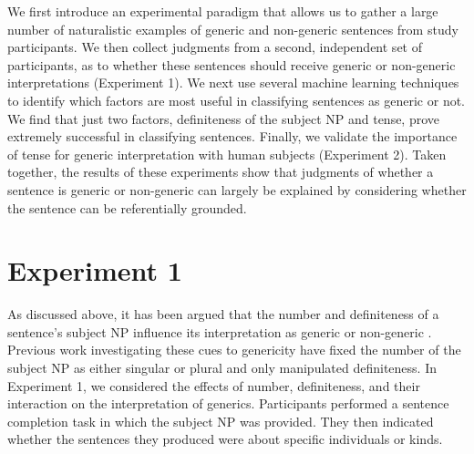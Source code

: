 \documentclass[10pt,letterpaper]{article}
\begin{document}
We first introduce an experimental paradigm that allows us to gather a large number of naturalistic examples of generic and non-generic sentences from study participants. We then collect judgments from a second, independent set of participants, as to whether these sentences should receive generic or non-generic interpretations (Experiment 1). We next use several machine learning techniques to identify which factors are most useful in classifying sentences as generic or not. We find that just two factors, definiteness of the subject NP and tense, prove extremely successful in classifying sentences. Finally, we validate the importance of tense for generic interpretation with human subjects (Experiment 2). Taken together, the results of these experiments show that judgments of whether a sentence is generic or non-generic can largely be explained by considering whether the sentence can be referentially grounded.

\section{Experiment 1}

As discussed above, it has been argued that the number and definiteness of a sentence's subject NP influence its interpretation as generic or non-generic \cite{Carlson:1977,Krifka:1995,Lyons:1977}. Previous work investigating these cues to genericity have fixed the number of the subject NP as either singular \cite{Cimpian:2011} or plural \cite{Gelman:2003} and only manipulated definiteness. In Experiment 1, we considered the effects of number, definiteness, and their interaction on the interpretation of generics. Participants performed a sentence completion task in which the subject NP was provided. They then indicated whether the sentences they produced were about specific individuals or kinds.
\end{document}
